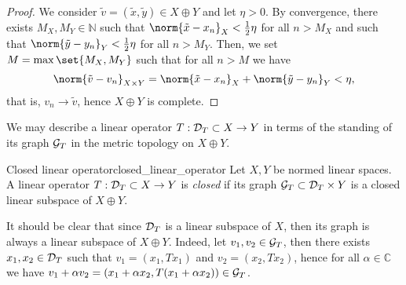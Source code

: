 \begin{proof}
    We consider \(\tilde{v} = (\tilde{x}, \tilde{y}) \in X \oplus Y\) and let \(\eta > 0\). By convergence, there exists \(M_X, M_Y \in \mathbb{N}\) such that \(\norm{\tilde{x} - x_n}_X < \frac12 \eta\) for all \(n > M_X\) and such that \(\norm{\tilde{y} - y_n}_Y < \frac12 \eta\) for all \(n > M_Y\). Then, we set \(M = \max\set{M_X, M_Y}\) such that for all \(n > M\) we have
    \begin{equation*}
        \norm{\tilde{v} - v_n}_{X\times Y} = \norm{\tilde{x} - x_n}_X + \norm{\tilde{y} - y_n}_Y < \eta,
    \end{equation*}
    that is, \(v_n \to \tilde{v}\), hence \(X \oplus Y\) is complete.
\end{proof}

We may describe a linear operator \(T : \mathcal{D}_{T} \subset X \to Y\) in terms of the standing of its graph \(\mathcal{G}_{T}\) in the metric topology on \(X \oplus Y\).
\begin{definition}{Closed linear operator}{closed_linear_operator}
    Let \(X, Y\) be normed linear spaces. A linear operator \(T : \mathcal{D}_{T} \subset X \to Y\) is \emph{closed} if its graph \(\mathcal{G}_{T} \subset \mathcal{D}_{T} \times Y\)  is a closed linear subspace of \(X \oplus Y\).
\end{definition}
\begin{remark}
    It should be clear that since \(\mathcal{D}_{T}\) is a linear subspace of \(X\), then its graph is always a linear subspace of \(X \oplus Y\). Indeed, let \(v_1, v_2 \in \mathcal{G}_{T}\), then there exists \(x_1, x_2 \in \mathcal{D}_{T}\) such that \(v_1 = (x_1, Tx_1)\) and \(v_2 = (x_2, Tx_2)\), hence for all \(\alpha \in \mathbb{C}\) we have \(v_1 + \alpha v_2 = (x_1 + \alpha x_2, T(x_1 + \alpha x_2)) \in \mathcal{G}_{T}\).
\end{remark}

